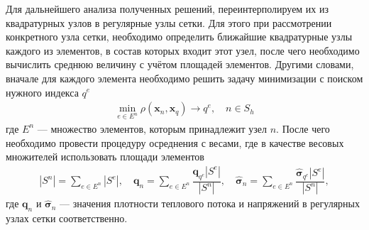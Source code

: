 Для дальнейшего анализа полученных решений, переинтерполируем их из квадратурных узлов в регулярные узлы сетки. Для этого при рассмотрении конкретного узла сетки, необходимо определить ближайшие квадратурные узлы каждого из элементов, в состав которых входит этот узел, после чего необходимо вычислить среднюю величину с учётом площадей элементов. Другими словами, вначале для каждого элемента необходимо решить задачу минимизации с поиском нужного индекса $q^e$
\begin{gather*}
	\min_{e \in E^n} \rho(\boldsymbol{x}_n, \boldsymbol{x}_q) \rightarrow q^e,
	\quad
	n \in S_h
\end{gather*}
где $E^n$ --- множество элементов, которым принадлежит узел $n$. После чего необходимо провести процедуру осреднения с весами, где в качестве весовых множителей использовать площади элементов
\begin{gather*}
	|S^n| = \sum\limits_{e \in E^n} |S^e|,
	\quad
	\boldsymbol{q}_n = \sum\limits_{e \in E^n} \dfrac{\boldsymbol{q}_{q^e} |S^e|}{|S^n|},
	\quad
	\widehat{\boldsymbol{\sigma}}_n = \sum\limits_{e \in E^n} \dfrac{\widehat{\boldsymbol{\sigma}}_{q^e} |S^e|}{|S^n|},
\end{gather*}
где $\boldsymbol{q}_n$ и $\widehat{\boldsymbol{\sigma}}_n$ --- значения плотности теплового потока и напряжений в регулярных узлах сетки соответственно.